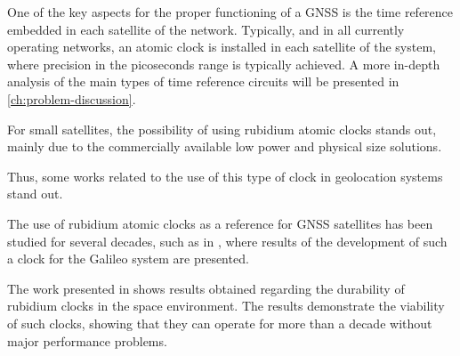 


One of the key aspects for the proper functioning of a GNSS is the time reference embedded in each satellite of the network. Typically, and in all currently operating networks, an atomic clock is installed in each satellite of the system, where precision in the picoseconds range is typically achieved. A more in-depth analysis of the main types of time reference circuits will be presented in \autoref{ch:problem-discussion}.

For small satellites, the possibility of using rubidium atomic clocks stands out, mainly due to the commercially available low power and physical size solutions.

Thus, some works related to the use of this type of clock in geolocation systems stand out.

The use of rubidium atomic clocks as a reference for GNSS satellites has been studied for several decades, such as in \cite{jeanmaire1999}, where results of the development of such a clock for the Galileo system are presented.

The work presented in \cite{camparo2012} shows results obtained regarding the durability of rubidium clocks in the space environment. The results demonstrate the viability of such clocks, showing that they can operate for more than a decade without major performance problems.

